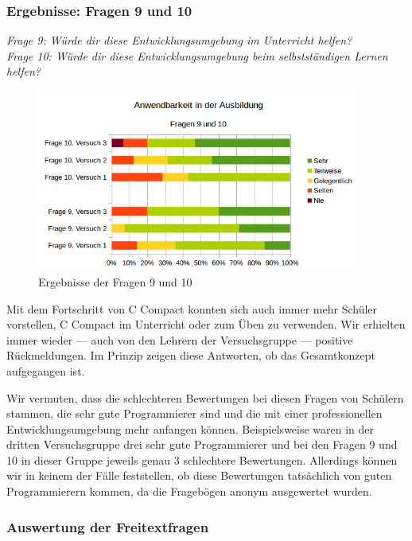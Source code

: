 \subsubsection*{Ergebnisse: Fragen 9 und 10}

\emph{Frage 9: Würde dir diese Entwicklungsumgebung im Unterricht helfen?\\
Frage 10: Würde dir diese Entwicklungsumgebung beim selbstständigen Lernen helfen?}

\begin{figure}[h!]
\centering
\includegraphics[width=0.95\textwidth]{./media/images/gui/trials/gui-f9-10.png}
\caption{Ergebnisse der Fragen 9 und 10}
\end{figure}

Mit dem Fortschritt von C Compact konnten sich auch immer mehr Schüler vorstellen, C Compact im Unterricht oder zum Üben zu verwenden. Wir erhielten immer wieder --- auch von den Lehrern der Versuchsgruppe --- positive Rückmeldungen. Im Prinzip zeigen diese Antworten, ob das Gesamtkonzept aufgegangen ist.

Wir vermuten, dass die schlechteren Bewertungen bei diesen Fragen von Schülern stammen, die sehr gute Programmierer sind und die mit einer professionellen Entwicklungsumgebung mehr anfangen können. Beispielsweise waren in der dritten Versuchsgruppe drei sehr gute Programmierer und bei den Fragen 9 und 10 in dieser Gruppe jeweils genau 3 schlechtere Bewertungen. Allerdings können wir in keinem der Fälle feststellen, ob diese Bewertungen tatsächlich von guten Programmierern kommen, da die Fragebögen anonym ausgewertet wurden.

\subsubsection*{Auswertung der Freitextfragen}

